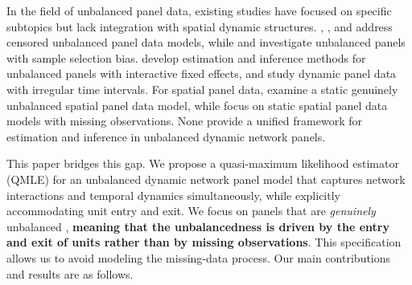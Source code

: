 \documentclass[11pt,a4paper]{article}
\begin{document}
In the field of unbalanced panel data, existing studies have focused on specific subtopics but lack integration with spatial dynamic structures. \cite{c50faaf4-3ca5-360a-914d-60311fe2980c}, \cite{1ade2690-c518-3924-afd9-60d7e947837b}, and \cite{HONORE2004293} address censored unbalanced panel data models, while \cite{WOOLDRIDGE1995115} and \cite{d0ceac3d-09ee-347a-9a49-b8b357c03f08} investigate unbalanced panels with sample selection bias. \cite{su_estimation_2025} develop estimation and inference methods for unbalanced panels with interactive fixed effects, and \cite{SASAKI2017320} study dynamic panel data with irregular time intervals. For spatial panel data, \cite{Meng21042026} examine a static genuinely unbalanced spatial panel data model, while \cite{Meng25072025} focus on static spatial panel data models with missing observations. None provide a unified framework for estimation and inference in unbalanced dynamic network panels.

This paper bridges this gap. We propose a quasi-maximum likelihood estimator (QMLE) for an unbalanced dynamic network panel model that captures network interactions and temporal dynamics simultaneously, while explicitly accommodating unit entry and exit.
We focus on panels that are \textit{genuinely} unbalanced \citep{Meng21042026}, \textbf{meaning that the unbalancedness is driven by the entry and exit of units rather than by missing observations}. This specification allows us to avoid modeling the missing-data process.
Our main contributions and results are as follows.
\end{document}
